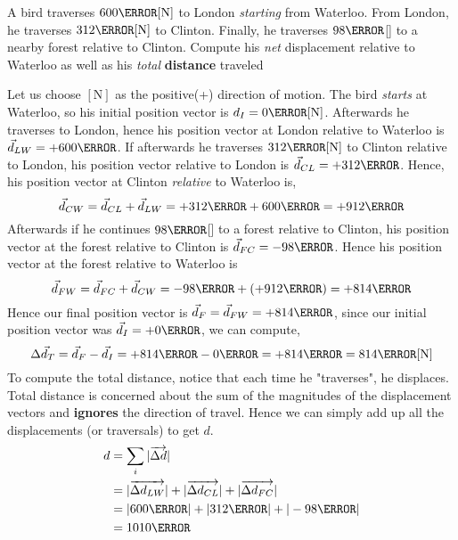 \documentclass[12pt]{article} %
\newcommand{\tx}[1]{\text{#1}}
\begin{document}
\begin{qstn}[5]
    A bird traverses $600\km[\tx{N}]$ to London \emph{starting} from Waterloo. From London, he traverses $312\km[\tx{N}]$ to Clinton. Finally, he traverses $98\km$[\tx{S}] to a nearby forest relative to Clinton. Compute his \emph{net} displacement relative to Waterloo as well as his \emph{total} \textbf{distance} traveled

    \begin{soln}
        Let us choose $[\tx{N}]$ as the positive(+) direction of motion. The bird \emph{starts} at Waterloo, so his initial position vector is $d_{I} = 0\km[\tx{N}]$. Afterwards he traverses to London, hence his position vector at London relative to Waterloo is $\vec d_{LW} = +600\km$. If afterwards he traverses $312\km[\tx{N}]$ to Clinton relative to London, his position vector relative to London is $\vec d_{CL} = +312\km$. Hence, his position vector at Clinton \emph{relative} to Waterloo is, $$\vec d_{CW} = \vec d_{CL} + \vec d_{LW} = +312\km +  600\km = +912\km$$
        Afterwards if he continues $98\km$[\tx{S}] to a forest relative to Clinton, his position vector at the forest relative to Clinton is $\vec d_{FC} = -98\km$. Hence his position vector at the forest relative to Waterloo is $$\vec d_{FW} = \vec d_{FC} + \vec d_{CW} = -98\km + (+912\km) = +814\km$$
        Hence our final position vector is $\vec d_F = \vec d_{FW} = +814 \km$, since our initial position vector was $\vec d_I = +0\km$, we can compute,
        $$\Delta \vec d_T = \vec d_F - \vec d_I = +814\km - 0\km = +814\km = 814\km[\tx{N}]$$
        To compute the total distance, notice that each time he "traverses", he displaces. Total distance is concerned about the sum of the magnitudes of the displacement vectors and \textbf{ignores} the direction of travel. Hence we can simply add up all the displacements (or traversals) to get $d$.
        \begin{align*}
            d &= \sum_i |\overrightarrow{\Delta d}|\\
            &= |\overrightarrow{\Delta d_{LW}}| + |\overrightarrow{\Delta d_{CL}}| + |\overrightarrow{\Delta d_{FC}}|\\
            &= |600\km| + |312\km| + |-98\km|\\
            &= 1010\km
        \end{align*}
        

    \end{soln}
    
\end{qstn}
\end{document}

